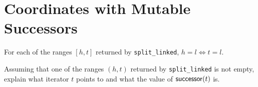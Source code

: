 \chapter{Coordinates with Mutable Successors}

\begin{lemma}
	For each of the ranges $[h, t]$ returned by \verb|split_linked|, $h = l \Leftrightarrow t = l$.
\end{lemma}

\begin{exercise}
	Assuming that one of the ranges $(h, t)$ returned by \verb|split_linked| is not empty, explain what
	iterator $t$ points to and what the value of $\mathsf{successor}(t)$ is.
\end{exercise}
